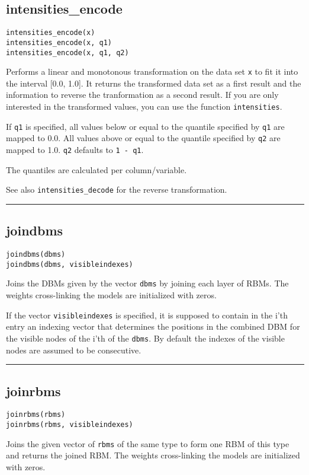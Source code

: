 \subsection*{intensities\_encode}  \label{bms_intensities_encode}
\begin{verbatim}
intensities_encode(x)
intensities_encode(x, q1)
intensities_encode(x, q1, q2)
\end{verbatim}
Performs a linear and monotonous transformation on the data set \texttt{x} to fit it into the interval [0.0, 1.0]. It returns the transformed data set as a first result and the information to reverse the tranformation as a second result. If you are only interested in the transformed values, you can use the function \texttt{intensities}.

If \texttt{q1} is specified, all values below or equal to the quantile specified  by \texttt{q1} are mapped to 0.0. All values above or equal to the quantile specified by \texttt{q2} are mapped to 1.0. \texttt{q2} defaults to \texttt{1 - q1}.

The quantiles are calculated per column/variable.

See also \texttt{intensities\_decode} for the reverse transformation.

\noindent\rule{\textwidth}{1pt}
\subsection*{joindbms}  \label{bms_joindbms}
\begin{verbatim}
joindbms(dbms)
joindbms(dbms, visibleindexes)
\end{verbatim}
Joins the DBMs given by the vector \texttt{dbms} by joining each layer of RBMs. The weights cross-linking the models are initialized with zeros.

If the vector \texttt{visibleindexes} is specified, it is supposed to contain in the i'th entry an indexing vector that determines the positions in the combined DBM for the visible nodes of the i'th of the \texttt{dbms}. By default the indexes of the visible nodes are assumed to be consecutive.

\noindent\rule{\textwidth}{1pt}
\subsection*{joinrbms}  \label{bms_joinrbms}
\begin{verbatim}
joinrbms(rbms)
joinrbms(rbms, visibleindexes)
\end{verbatim}
Joins the given vector of \texttt{rbms} of the same type to form one RBM of this type and returns the joined RBM. The weights cross-linking the models are initialized with zeros.

